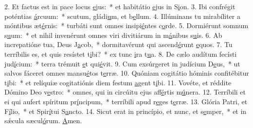 2. Et factus est in pace locus \uline{e}jus:~* et habitátio \uline{e}jus in S\uline{i}on.
3. Ibi confrégit poténtias \uline{á}rcuum:~* scutum, gládi\uline{u}m, et b\uline{e}llum.
4. Illúminans tu mirabíliter a móntibus æt\uline{é}rnis:~* turbáti sunt omnes insipi\uline{é}ntes c\uline{o}rde.
5. Dormiérunt somnum s\uline{u}um:~* et nihil invenérunt omnes viri divitiárum in m\uline{á}nibus s\uline{u}is.
6. Ab increpatióne tua, Deus J\uline{a}cob,~* dormitavérunt qui ascend\uline{é}runt \uline{e}quos.
7. Tu terríbilis es, et quis resístet t\uline{i}bi?~* ex tunc \uline{i}ra t\uline{u}a.
8. De cælo audítum fecísti jud\uline{í}cium:~* terra trémuit \uline{e}t qui\uline{é}vit.
9. Cum exsúrgeret in judícium D\uline{e}us,~* ut salvos fáceret omnes mansu\uline{é}tos t\uline{e}rræ.
10. Quóniam cogitátio hóminis confitébitur t\uline{i}bi:~* et relíquiæ cogitatiónis diem festum \uline{a}gent t\uline{i}bi.
11. Vovéte, et réddite Dómino Deo v\uline{e}stro:~* omnes, qui in circúitu ejus aff\uline{é}rtis m\uline{ú}nera.
12. Terríbili et ei qui aufert spíritum pr\uline{í}ncipum,~* terríbili apud r\uline{e}ges t\uline{e}rræ.
13. Glória Patri, et F\uline{í}lio,~* et Spir\uline{í}tui S\uline{a}ncto.
14. Sicut erat in princípio, et nunc, et s\uline{e}mper,~* et in sǽcula sæcul\uline{ó}rum. \uline{A}men.
